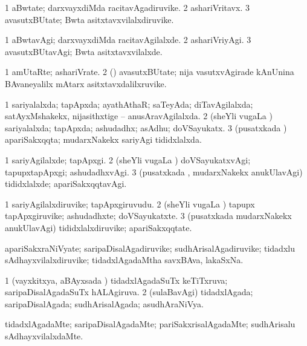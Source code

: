 \bentry
{}
\gl{\nA}
\bmng
\bnum
\num{1} aBwtate; darxvayxdiMda racitavAgadiruvike. 
\num{2} ashariVritavx. 
\num{3} avasutxBUtate; Bwta asitxtavxvilalxdiruvike. 
\enum
\emng
\eentry

\bentry
{}
\gl{\kirxvi}
\bmng
\bnum
\num{1} aBwtavAgi; darxvayxdiMda racitavAgilalxde. 
\num{2} ashariVriyAgi. 
\num{3} avasutxBUtavAgi; Bwta asitxtavxvilalxde. 
\enum
\emng
\eentry

\bentry
{}
\gl{\nA}
\bmng
\bnum
\num{1} amUtaRte; ashariVrate. 
\num{2} (\nAyxshA) avasutxBUtate; nija vasutxvAgirade kAnUnina BAvaneyalilx mAtarx asitxtavxdalilxruvike. 
\enum
\emng
\eentry

\bentry
{}
\gl{\gu}
\bmng
\bnum
\num{1} sariyalalxda; tapApxda; ayathAthaR; saTeyAda; diTavAgilalxda; satAyxMshakekx, nijasithxtige -- anusAravAgilalxda. 
\num{2} (sheYli \mo vugaLa \vi) sariyalalxda; tapApxda; ashudadhx; asAdhu; doVSayukatx. 
\num{3} (pusatxkada \vi) apariSakxqqta; mudarxNakekx sariyAgi tididxlalxda. 
\enum
\emng
\eentry

\bentry
{}
\gl{\kirxvi}
\bmng
\bnum
\num{1} sariyAgilalxde; tapApxgi. 
\num{2} (sheYli \mo vugaLa \vi) doVSayukatxvAgi; tapupxtapApxgi; ashudadhxvAgi. 
\num{3} (pusatxkada \vi, mudarxNakekx anukUlavAgi) tididxlalxde; apariSakxqqtavAgi. 
\enum
\emng
\eentry

\bentry
{}
\gl{\nA}
\bmng
\bnum
\num{1} sariyAgilalxdiruvike; tapApxgiruvudu. 
\num{2} (sheYli \mo vugaLa \vi) tapupx tapApxgiruvike; ashudadhxte; doVSayukatxte. 
\num{3} (pusatxkada \vi mudarxNakekx anukUlavAgi) tididxlalxdiruvike; apariSakxqqtate. 
\enum
\emng
\eentry

\bentry
{}
\gl{\nA}
\bmng
apariSakxraNiVyate; saripaDisalAgadiruvike; sudhArisalAgadiruvike; tidadxlu sAdhayxvilalxdiruvike; tidadxlAgadaMtha savxBAva, lakaSxNa. 
\emng
\eentry

\bentry
{}
\gl{\gu}
\bmng
\bnum
\num{1} (vayxkitxya, aBAyxsada \vi) tidadxlAgadaSuTx keTiTxruva; saripaDisalAgadaSuTx hALAgiruva. 
\num{2} (sulaBavAgi) tidadxlAgada; saripaDisalAgada; sudhArisalAgada; asudhAraNiVya. 
\enum
\emng
\eentry

\bentry
{}
\gl{\kirxvi}
\bmng
tidadxlAgadaMte; saripaDisalAgadaMte; pariSakxrisalAgadaMte; sudhArisalu sAdhayxvilalxdaMte. 
\emng
\eentry

